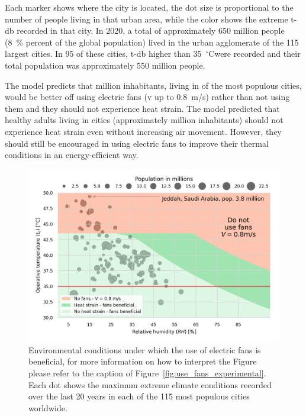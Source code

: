 Each marker shows where the city is located, the dot size is proportional to the number of people living in that urban area, while the color shows the extreme \ac{t-db} recorded in that city.
In 2020, a total of approximately 650 million people (8~\% percent of the global population) lived in the urban agglomerate of the 115 largest cities.
In 95 of these cities, \ac{t-db} higher than 35~$^{\circ}$C\@ were recorded and their total population was approximately 550 million people.

The model predicts that  million inhabitants, living in  of the most populous cities, would be better off using electric fans (\ac{v} up to 0.8~m/s) rather than not using them and they should not experience heat strain.
The  model predicted that healthy adults living in  cities (approximately  million inhabitants) should not experience heat strain even without increasing air movement.
However, they should still be encouraged in using electric fans to improve their thermal conditions in an energy-efficient way.

\begin{figure}[hbt!]
    \centering
    \includegraphics[width=\textwidth]{figures/use_fans_and_population}
    \caption{Environmental conditions under which the use of electric fans is beneficial, for more information on how to interpret the Figure please refer to the caption of Figure~\ref{fig:use_fans_experimental}.
    Each dot shows the maximum extreme climate conditions recorded over the last 20 years in each of the 115 most populous cities worldwide.}
    \label{fig:use_fans_and_population}
\end{figure}

